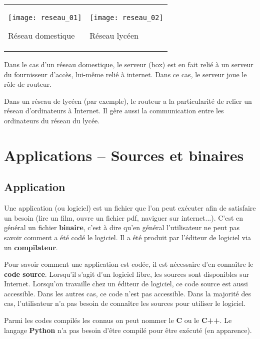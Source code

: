 \begin{center}
\begin{tabular}{p{}p{}}
\begin{center}
\texttt{[image: reseau\_01]}

Réseau domestique
\end{center} &
\begin{center}
\texttt{[image: reseau\_02]}

Réseau lycéen
\end{center}
\end{tabular}
\end{center}


Dans le cas d’un réseau domestique, le serveur (box) est en fait relié à un serveur du fournisseur d’accès, lui-même relié à internet. Dans ce cas, le serveur joue le rôle de routeur. 

Dans un réseau de lycéen (par exemple), le routeur a la particularité de relier un réseau d’ordinateurs à Internet. Il gère aussi la communication entre les ordinateurs du réseau du lycée.

\section{Applications -- Sources et binaires}
\subsection{Application}
Une application (ou logiciel) est un fichier que l'on peut exécuter afin de satisfaire un besoin (lire un film, ouvre un fichier pdf, naviguer sur internet...). C'est en général un fichier \textbf{binaire}, c'est à dire qu'en général l'utilisateur ne peut pas savoir comment a été codé le logiciel. Il a été produit par l'éditeur de logiciel via un \textbf{compilateur}.

Pour savoir comment une application est codée, il est nécessaire d'en connaître le \textbf{code source}.  Lorsqu'il s'agit d'un logiciel libre, les sources sont disponibles sur Internet. Lorsqu'on travaille chez un éditeur de logiciel, ce code source est aussi accessible. Dans les autres cas, ce code n'est pas accessible. Dans la majorité des cas, l'utilisateur n'a pas besoin de connaître les sources pour utiliser le logiciel. 

Parmi les codes compilés les connus on peut nommer le \textbf{C} ou le \textbf{C++}. Le langage \textbf{Python} n'a pas besoin d'être compilé pour être exécuté (en apparence). 




